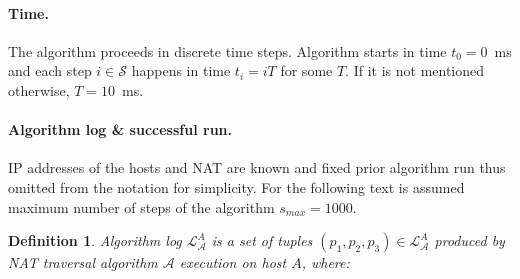 \documentclass[twoside]{article}
\newtheorem{mydef}{Definition}
\begin{document}
\begin{multicols}{2}
\paragraph{Time.} 
The algorithm proceeds in discrete time steps. Algorithm starts in time $t_0 = 0$~ms and each step $i \in \mathcal{S}$
happens in time $t_i = iT$ for some $T$. If it is not mentioned otherwise, $T = 10$~ms.


\paragraph{Algorithm log \& successful run.} IP addresses of the hosts and NAT are known and fixed prior algorithm run thus omitted
from the notation for simplicity. For the following text is assumed maximum number of steps of the algorithm $s_{max}=1000$.

\begin{mydef}
\label{def:log}
Algorithm log $\mathcal{L}^A_{\mathcal{A}}$ is a set of tuples $(p_1, p_2, p_3) \in \mathcal{L}^A_{\mathcal{A}}$ produced
by NAT traversal algorithm $\mathcal{A}$ execution on host $A$, where: \\


\end{mydef}
\end{multicols}
\end{document}
